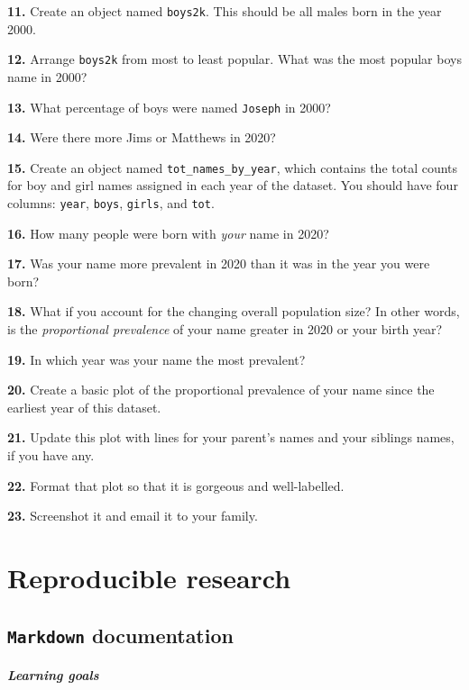 \documentclass[
]{book}
\begin{document}
\textbf{11.} Create an object named \texttt{boys2k}. This should be all males born in the year 2000.

\textbf{12.} Arrange \texttt{boys2k} from most to least popular. What was the most popular boys name in 2000?

\textbf{13.} What percentage of boys were named \texttt{Joseph} in 2000?

\textbf{14.} Were there more Jims or Matthews in 2020?

\textbf{15.} Create an object named \texttt{tot\_names\_by\_year}, which contains the total counts for boy and girl names assigned in each year of the dataset. You should have four columns: \texttt{year}, \texttt{boys}, \texttt{girls}, and \texttt{tot}.

\textbf{16.} How many people were born with \emph{your} name in 2020?

\textbf{17.} Was your name more prevalent in 2020 than it was in the year you were born?

\textbf{18.} What if you account for the changing overall population size? In other words, is the \emph{proportional prevalence} of your name greater in 2020 or your birth year?

\textbf{19.} In which year was your name the most prevalent?

\textbf{20.} Create a basic plot of the proportional prevalence of your name since the earliest year of this dataset.

\textbf{21.} Update this plot with lines for your parent's names and your siblings names, if you have any.

\textbf{22.} Format that plot so that it is gorgeous and well-labelled.

\textbf{23.} Screenshot it and email it to your family.

\hypertarget{part-reproducible-research}{%
\part{Reproducible research}\label{part-reproducible-research}}

\hypertarget{markdown-documentation}{%
\chapter{\texorpdfstring{\texttt{Markdown} documentation}{Markdown documentation}}\label{markdown-documentation}}

\hypertarget{learning-goals-10}{%
\subsubsection*{Learning goals}\label{learning-goals-10}}
\end{document}
